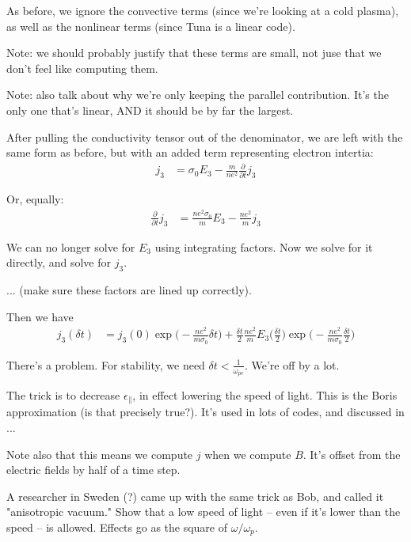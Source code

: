 As before, we ignore the convective terms (since we're looking at a cold plasma), as well as the nonlinear terms (since Tuna is a linear code). 

Note: we should probably justify that these terms are small, not juse that we don't feel like computing them. 

Note: also talk about why we're only keeping the parallel contribution. It's the only one that's linear, AND it should be by far the largest. 

After pulling the conductivity tensor out of the denominator, we are left with the same form as before, but with an added term representing electron intertia:
\begin{align}
  j_3 & =
  \sigma_0 E_3 -
  \frac{m}{n e^2} \frac{\partial}{\partial t} j_3
\end{align}

Or, equally: 
\begin{align}
  \frac{\partial}{\partial t} j_3 & = 
  \frac{n e^2 \sigma_0}{m} E_3 - 
  \frac{n e^2}{m} j_3
\end{align}

We can no longer solve for $E_3$ using integrating factors. Now we solve for it directly, and solve for $j_3$. 

... (make sure these factors are lined up correctly). 

Then we have 
\begin{align}
  j_3(\delta t) & = 
  j_3(0) \exp \big( -\frac{n e^2}{m \sigma_0} \delta t \big) +  
  \frac{\delta t}{2} \frac{n e^2}{m} E_3 
    \big( \frac{\delta t}{2} \big) \exp \big( -\frac{n e^2}{m \sigma_0} \frac{\delta t}{2} \big)
\end{align}

There's a problem. For stability, we need $\delta t < \frac{1}{ \omega_{p e} }$. We're off by a lot. 

The trick is to decrease $\epsilon_\parallel$, in effect lowering the speed of light. This is the Boris approximation (is that precisely true?). It's used in lots of codes, and discussed in ...

Note also that this means we compute $j$ when we compute $B$. It's offset from the electric fields by half of a time step. 

A researcher in Sweden (?) came up with the same trick as Bob, and called it "anisotropic vacuum." Show that a low speed of light -- even if it's lower than the \Alfven speed -- is allowed. Effects go as the square of $\omega/\omega_p$. 

